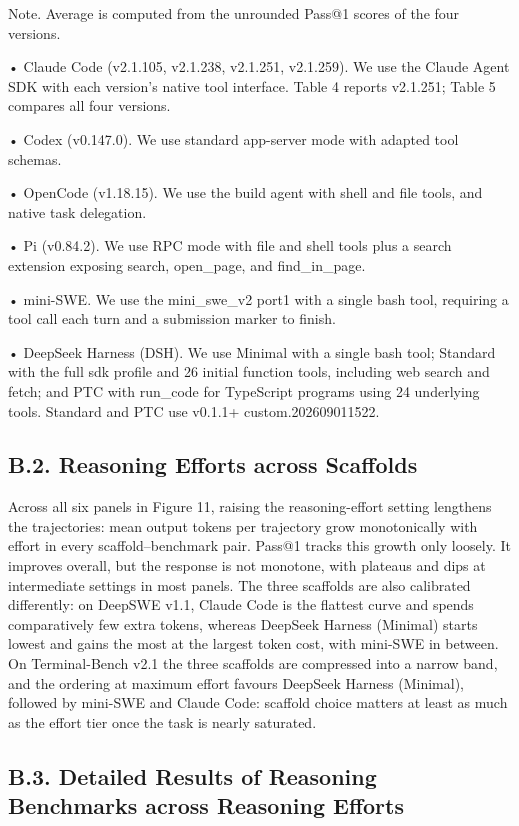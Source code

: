 \documentclass[
  10
]{article}
\begin{document}
Note. Average is computed from the unrounded Pass@1 scores of the four
versions.

• Claude Code (v2.1.105, v2.1.238, v2.1.251, v2.1.259). We use the
Claude Agent SDK with each version's native tool interface. Table 4
reports v2.1.251; Table 5 compares all four versions.

• Codex (v0.147.0). We use standard app-server mode with adapted tool
schemas.

• OpenCode (v1.18.15). We use the build agent with shell and file tools,
and native task delegation.

• Pi (v0.84.2). We use RPC mode with file and shell tools plus a search
extension exposing search, open\_page, and find\_in\_page.

• mini-SWE. We use the mini\_swe\_v2 port1 with a single bash tool,
requiring a tool call each turn and a submission marker to finish.

• DeepSeek Harness (DSH). We use Minimal with a single bash tool;
Standard with the full sdk profile and 26 initial function tools,
including web search and fetch; and PTC with run\_code for TypeScript
programs using 24 underlying tools. Standard and PTC use v0.1.1+
custom.202609011522.

\subsection{B.2. Reasoning Efforts across
Scaffolds}\label{b.2.-reasoning-efforts-across-scaffolds}

Across all six panels in Figure 11, raising the reasoning-effort setting
lengthens the trajectories: mean output tokens per trajectory grow
monotonically with effort in every scaffold--benchmark pair. Pass@1
tracks this growth only loosely. It improves overall, but the response
is not monotone, with plateaus and dips at intermediate settings in most
panels. The three scaffolds are also calibrated differently: on DeepSWE
v1.1, Claude Code is the flattest curve and spends comparatively few
extra tokens, whereas DeepSeek Harness (Minimal) starts lowest and gains
the most at the largest token cost, with mini-SWE in between. On
Terminal-Bench v2.1 the three scaffolds are compressed into a narrow
band, and the ordering at maximum effort favours DeepSeek Harness
(Minimal), followed by mini-SWE and Claude Code: scaffold choice matters
at least as much as the effort tier once the task is nearly saturated.

\subsection{B.3. Detailed Results of Reasoning Benchmarks across
Reasoning
Efforts}\label{b.3.-detailed-results-of-reasoning-benchmarks-across-reasoning-efforts}
\end{document}
